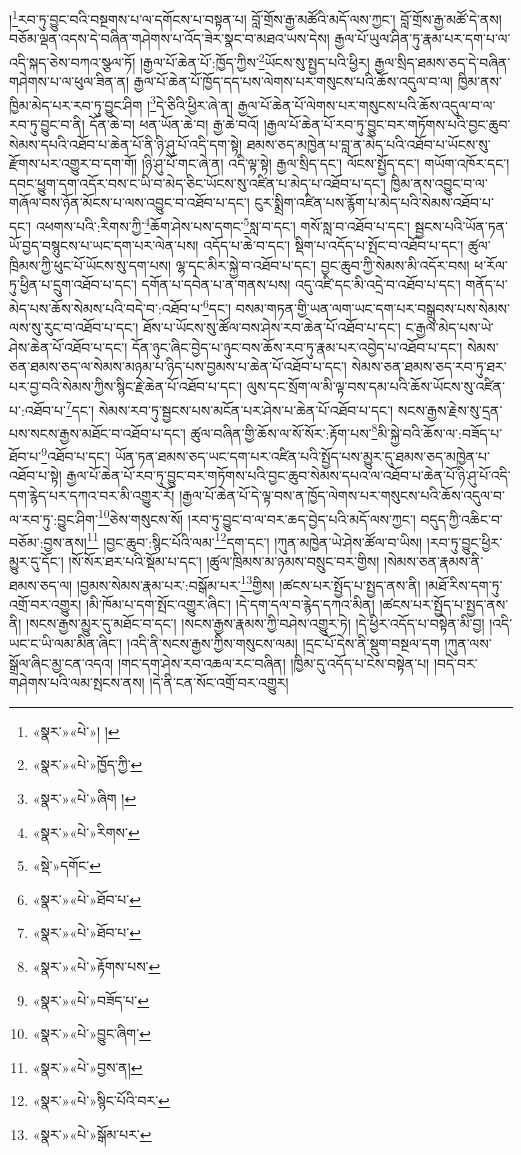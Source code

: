 །\footnote{«སྣར་»«པེ་»། །}རབ་ཏུ་བྱུང་བའི་བསྔགས་པ་ལ་དགོངས་པ་བསྟན་པ། བློ་གྲོས་རྒྱ་མཚོའི་མདོ་ལས་ཀྱང་། བློ་གྲོས་རྒྱ་མཚོ་དེ་ནས། བཅོམ་ལྡན་འདས་དེ་བཞིན་གཤེགས་པ་འོད་ཟེར་སྣང་བ་མཐའ་ཡས་དེས། རྒྱལ་པོ་ཡུལ་ཤིན་ཏུ་རྣམ་པར་དག་པ་ལ་འདི་སྐད་ཅེས་བཀའ་སྩལ་ཏོ། །རྒྱལ་པོ་ཆེན་པོ་:ཁྱོད་ཀྱིས་\footnote{«སྣར་»«པེ་»ཁྱོད་ཀྱི་}ཡོངས་སུ་སྤྱད་པའི་ཕྱིར། རྒྱལ་སྲིད་ཐམས་ཅད་དེ་བཞིན་གཤེགས་པ་ལ་ཕུལ་ཟིན་ན། རྒྱལ་པོ་ཆེན་པོ་ཁྱོད་དད་པས་ལེགས་པར་གསུངས་པའི་ཆོས་འདུལ་བ་ལ། ཁྱིམ་ནས་ཁྱིམ་མེད་པར་རབ་ཏུ་བྱུང་ཤིག །\footnote{«སྣར་»«པེ་»ཞིག །}དེ་ཅིའི་ཕྱིར་ཞེ་ན། རྒྱལ་པོ་ཆེན་པོ་ལེགས་པར་གསུངས་པའི་ཆོས་འདུལ་བ་ལ་རབ་ཏུ་བྱུང་བ་ནི། དོན་ཆེ་བ། ཕན་ཡོན་ཆེ་བ། རྒྱ་ཆེ་བའོ། །རྒྱལ་པོ་ཆེན་པོ་རབ་ཏུ་བྱུང་བར་གཏོགས་པའི་བྱང་ཆུབ་སེམས་དཔའི་འཐོབ་པ་ཆེན་པོ་ནི་ཉི་ཤུ་པོ་འདི་དག་སྟེ། ཐམས་ཅད་མཁྱེན་པ་བླ་ན་མེད་པའི་འཐོབ་པ་ཡོངས་སུ་རྫོགས་པར་འགྱུར་བ་དག་གོ། །ཉི་ཤུ་པོ་གང་ཞེ་ན། འདི་ལྟ་སྟེ། རྒྱལ་སྲིད་དང་། ལོངས་སྤྱོད་དང་། གཡོག་འཁོར་དང་། དབང་ཕྱུག་དག་འདོར་བས་ང་ཡི་བ་མེད་ཅིང་ཡོངས་སུ་འཛིན་པ་མེད་པ་འཐོབ་པ་དང་། ཁྱིམ་ནས་འབྱུང་བ་ལ་གཞོལ་བས་ཉོན་མོངས་པ་ལས་འབྱུང་བ་འཐོབ་པ་དང་། ངུར་སྨྲིག་འཛིན་པས་རྙོག་པ་མེད་པའི་སེམས་འཐོབ་པ་དང་། འཕགས་པའི་:རིགས་ཀྱི་\footnote{«སྣར་»«པེ་»རིགས་}ཆོག་ཤེས་པས་དགང་\footnote{«སྡེ་»དགོང་}སླ་བ་དང་། གསོ་སླ་བ་འཐོབ་པ་དང་། སྦྱངས་པའི་ཡོན་ཏན་ཡོ་བྱད་བསྙུངས་པ་ཡང་དག་པར་ལེན་པས། འདོད་པ་ཆེ་བ་དང་། སྡིག་པ་འདོད་པ་སྤོང་བ་འཐོབ་པ་དང་། ཚུལ་ཁྲིམས་ཀྱི་ཕུང་པོ་ཡོངས་སུ་དག་པས། ལྷ་དང་མིར་སྐྱེ་བ་འཐོབ་པ་དང་། བྱང་ཆུབ་ཀྱི་སེམས་མི་འདོར་བས། ཕ་རོལ་ཏུ་ཕྱིན་པ་དྲུག་འཐོབ་པ་དང་། དགོན་པ་དབེན་པ་ན་གནས་པས། འདུ་འཛི་དང་མི་འདྲེ་བ་འཐོབ་པ་དང་། གནོད་པ་མེད་པས་ཆོས་སེམས་པའི་བདེ་བ་:འཐོབ་པ་\footnote{«སྣར་»«པེ་»ཐོབ་པ་}དང་། བསམ་གཏན་གྱི་ཡན་ལག་ཡང་དག་པར་བསྒྲུབས་པས་སེམས་ལས་སུ་རུང་བ་འཐོབ་པ་དང་། ཐོས་པ་ཡོངས་སུ་ཚོལ་བས་ཤེས་རབ་ཆེན་པོ་འཐོབ་པ་དང་། ང་རྒྱལ་མེད་པས་ཡེ་ཤེས་ཆེན་པོ་འཐོབ་པ་དང་། དོན་ཉུང་ཞིང་བྱེད་པ་ཉུང་བས་ཆོས་རབ་ཏུ་རྣམ་པར་འབྱེད་པ་འཐོབ་པ་དང་། སེམས་ཅན་ཐམས་ཅད་ལ་སེམས་མཉམ་པ་ཉིད་པས་བྱམས་པ་ཆེན་པོ་འཐོབ་པ་དང་། སེམས་ཅན་ཐམས་ཅད་རབ་ཏུ་ཐར་པར་བྱ་བའི་སེམས་ཀྱིས་སྙིང་རྗེ་ཆེན་པོ་འཐོབ་པ་དང་། ལུས་དང་སྲོག་ལ་མི་ལྟ་བས་དམ་པའི་ཆོས་ཡོངས་སུ་འཛིན་པ་:འཐོབ་པ་\footnote{«སྣར་»«པེ་»ཐོབ་པ་}དང་། སེམས་རབ་ཏུ་སྦྱངས་པས་མངོན་པར་ཤེས་པ་ཆེན་པོ་འཐོབ་པ་དང་། སངས་རྒྱས་རྗེས་སུ་དྲན་པས་སངས་རྒྱས་མཐོང་བ་འཐོབ་པ་དང་། ཚུལ་བཞིན་གྱི་ཆོས་ལ་སོ་སོར་:རྟོག་པས་\footnote{«སྣར་»«པེ་»རྟོགས་པས་}མི་སྐྱེ་བའི་ཆོས་ལ་:བཟོད་པ་ཐོབ་པ་\footnote{«སྣར་»«པེ་»བཟོད་པ་}འཐོབ་པ་དང་། ཡོན་ཏན་ཐམས་ཅད་ཡང་དག་པར་འཛིན་པའི་སྤྱོད་པས་མྱུར་དུ་ཐམས་ཅད་མཁྱེན་པ་འཐོབ་པ་སྟེ། རྒྱལ་པོ་ཆེན་པོ་རབ་ཏུ་བྱུང་བར་གཏོགས་པའི་བྱང་ཆུབ་སེམས་དཔའ་ལ་འཐོབ་པ་ཆེན་པོ་ཉི་ཤུ་པོ་འདི་དག་རྙེད་པར་དཀའ་བར་མི་འགྱུར་རོ། །རྒྱལ་པོ་ཆེན་པོ་དེ་ལྟ་བས་ན་ཁྱོད་ལེགས་པར་གསུངས་པའི་ཆོས་འདུལ་བ་ལ་རབ་ཏུ་:བྱུང་ཤིག་\footnote{«སྣར་»«པེ་»བྱུང་ཞིག་}ཅེས་གསུངས་སོ། །རབ་ཏུ་བྱུང་བ་ལ་བར་ཆད་བྱེད་པའི་མདོ་ལས་ཀྱང་། བདུད་ཀྱི་འཆིང་བ་བཅོམ་:བྱས་ནས།\footnote{«སྣར་»«པེ་»བྱས་ན།} །བྱང་ཆུབ་:སྙིང་པོའི་ལམ་\footnote{«སྣར་»«པེ་»སྙིང་པོའི་བར་}དག་དང་། །ཀུན་མཁྱེན་ཡེ་ཤེས་ཚོལ་བ་ཡིས། །རབ་ཏུ་བྱུང་ཕྱིར་མྱུར་དུ་དོང་། །སོ་སོར་ཐར་པའི་སྡོམ་པ་དང་། །ཚུལ་ཁྲིམས་མ་ཉམས་བསྲུང་བར་གྱིས། །སེམས་ཅན་རྣམས་ནི་ཐམས་ཅད་ལ། །བྱམས་སེམས་རྣམ་པར་:བསྒོམ་པར་\footnote{«སྣར་»«པེ་»སྒོམ་པར་}གྱིས། །ཚངས་པར་སྤྱོད་པ་སྤྱད་ནས་ནི། །མཐོ་རིས་དག་ཏུ་འགྲོ་བར་འགྱུར། །མི་ཁོམ་པ་དག་སྤོང་འགྱུར་ཞིང་། །དེ་དག་དལ་བ་རྙེད་དཀའ་མིན། །ཚངས་པར་སྤྱོད་པ་སྤྱད་ནས་ནི། །སངས་རྒྱས་མྱུར་དུ་མཐོང་བ་དང་། །སངས་རྒྱས་རྣམས་ཀྱི་བཤེས་འགྱུར་ཏེ། །དེ་ཕྱིར་འདོད་པ་བསྟེན་མི་བྱ། །འདི་ཡང་ང་ཡི་ལམ་མིན་ཞིང་། །འདི་ནི་སངས་རྒྱས་ཀྱིས་གསུངས་ལམ། །དྲང་པོ་དེས་ནི་སྡུག་བསྔལ་དག །ཀུན་ལས་སྒྲོལ་ཞིང་མྱ་ངན་འདའ། །གང་དག་ཤེས་རབ་འཆལ་རང་བཞིན། །ཁྱིམ་དུ་འདོད་པ་ངེས་བསྟེན་པ། །བདེ་བར་གཤེགས་པའི་ལམ་སྤངས་ནས། །དེ་ནི་ངན་སོང་འགྲོ་བར་འགྱུར། 